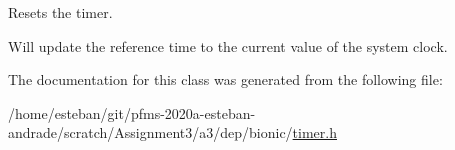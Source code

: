 Resets the timer. 

Will update the reference time to the current value of the system clock. 

The documentation for this class was generated from the following file\+:\begin{DoxyCompactItemize}
\item 
/home/esteban/git/pfms-\/2020a-\/esteban-\/andrade/scratch/\+Assignment3/a3/dep/bionic/\hyperlink{bionic_2timer_8h}{timer.\+h}\end{DoxyCompactItemize}
